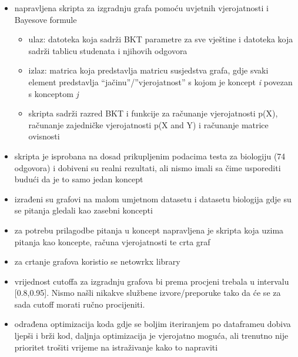 \documentclass[times, utf8,projekt]{fer}
\begin{document}
		\begin{itemize}
			\item napravljena skripta za izgradnju grafa pomoću uvjetnih vjerojatnosti i Bayesove formule
			\begin{itemize}
				\item ulaz: datoteka koja sadrži BKT parametre za sve vještine i datoteka koja sadrži tablicu studenata i njihovih odgovora
				\item izlaz: matrica koja predstavlja matricu susjedstva grafa, gdje svaki element predstavlja “jačinu”/”vjerojatnost” s kojom je koncept \textit{i} povezan s konceptom \textit{j}
				\item skripta sadrži razred BKT i funkcije za računanje vjerojatnosti p(X), računanje zajedničke vjerojatnosti p(X and Y) i računanje matrice ovisnosti
			\end{itemize}
			\item skripta je isprobana na dosad prikupljenim podacima testa za biologiju (74 odgovora) i dobiveni su realni rezultati, ali nismo imali sa čime usporediti budući da je to samo jedan koncept
			\item izrađeni su grafovi na malom umjetnom datasetu i datasetu biologija gdje su se pitanja gledali kao zasebni koncepti
			\item za potrebu prilagodbe pitanja u koncept napravljena je skripta koja uzima pitanja kao koncepte, računa vjerojatnosti te crta graf
			\item za crtanje grafova koristio se netowrkx library
			\item vrijednost cutoffa za izgradnju grafova bi prema procjeni trebala u intervalu [0.8,0.95]. Nismo našli nikakve službene izvore/preporuke tako da  će se za sada cutoff morati ručno procijeniti.
			\item odrađena optimizacija koda gdje se boljim iteriranjem po dataframeu dobiva ljepši i brži kod, daljnja optimizacija je vjerojatno moguća, ali trenutno nije prioritet trošiti vrijeme na istraživanje kako to napraviti
		\end{itemize}
\end{document}
